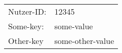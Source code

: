 \documentclass[10pt,a4paper]{article}
\author{Sebastian}
\begin{document}
\begin{tabular}{l l}
Nutzer-ID: & 12345 \\
Some-key: & some-value \\
Other-key & some-other-value
\end{tabular}
\end{document}
